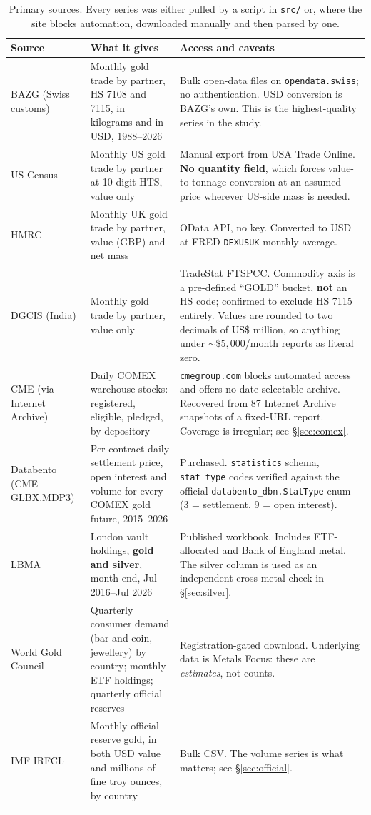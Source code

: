 \documentclass[11pt,a4paper]{article}
\begin{document}
\begin{longtable}{@{}p{3.0cm}p{5.2cm}p{6.3cm}@{}}
\toprule
\textbf{Source} & \textbf{What it gives} & \textbf{Access and caveats} \\
\midrule
\endhead
BAZG (Swiss customs) & Monthly gold trade by partner, HS 7108 and 7115, in kilograms and in
USD, 1988--2026 & Bulk open-data files on \texttt{opendata.swiss}; no authentication. USD
conversion is BAZG's own. This is the highest-quality series in the study. \\
\addlinespace
US Census & Monthly US gold trade by partner at 10-digit HTS, value only & Manual export from
USA Trade Online. \textbf{No quantity field}, which forces value-to-tonnage conversion at an
assumed price wherever US-side mass is needed. \\
\addlinespace
HMRC & Monthly UK gold trade by partner, value (GBP) and net mass & OData API, no key.
Converted to USD at FRED \texttt{DEXUSUK} monthly average. \\
\addlinespace
DGCIS (India) & Monthly gold trade by partner, value only & TradeStat FTSPCC. Commodity axis
is a pre-defined ``GOLD'' bucket, \textbf{not} an HS code; confirmed to exclude HS 7115
entirely. Values are rounded to two decimals of US\$ million, so anything under
${\sim}\$5{,}000$/month reports as literal zero. \\
\addlinespace
CME (via Internet Archive) & Daily COMEX warehouse stocks: registered, eligible, pledged, by
depository & \texttt{cmegroup.com} blocks automated access and offers no date-selectable
archive. Recovered from 87 Internet Archive snapshots of a fixed-URL report. Coverage is
irregular; see \S\ref{sec:comex}. \\
\addlinespace
Databento (CME GLBX.MDP3) & Per-contract daily settlement price, open interest and volume for
every COMEX gold future, 2015--2026 & Purchased. \texttt{statistics} schema, \texttt{stat\_type}
codes verified against the official \texttt{databento\_dbn.StatType} enum
(3 = settlement, 9 = open interest). \\
\addlinespace
LBMA & London vault holdings, \textbf{gold and silver}, month-end, Jul 2016--Jul 2026 &
Published workbook. Includes ETF-allocated and Bank of England metal. The silver column is
used as an independent cross-metal check in \S\ref{sec:silver}. \\
\addlinespace
World Gold Council & Quarterly consumer demand (bar and coin, jewellery) by country;
monthly ETF holdings; quarterly official reserves & Registration-gated download. Underlying
data is Metals Focus: these are \emph{estimates}, not counts. \\
\addlinespace
IMF IRFCL & Monthly official reserve gold, in both USD value and millions of fine troy ounces,
by country & Bulk CSV. The volume series is what matters; see \S\ref{sec:official}. \\
\bottomrule
\caption{Primary sources. Every series was either pulled by a script in \texttt{src/} or, where
the site blocks automation, downloaded manually and then parsed by one.}
\end{longtable}
\end{document}
